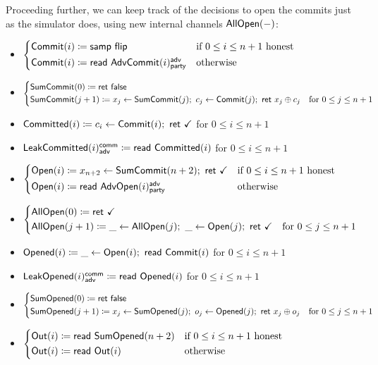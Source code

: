 \noindent Proceeding further, we can keep track of the decisions to open the commits just as the simulator does, using new internal channels $\mathsf{AllOpen}(-)$:

\begin{itemize}
\item {\color{blue} $\begin{cases*} \Commit(i) \coloneqq \samp{\flip} & \text{if $0 \leq i \leq n+1$ honest} \\ \Commit(i) \coloneqq \read{\AdvCommit(i)^\adv_\party} & \text{otherwise} \end{cases*}$}
\item {\color{blue} $\begin{cases*} \SumCommit(0) \coloneqq \ret{\false} & \\ \SumCommit(j+1) \coloneqq x_j \leftarrow \SumCommit(j); \ c_j \leftarrow \Commit(j); \ \ret{x_j \oplus c_j} & \text{for $0 \leq j \leq n+1$} \end{cases*}$}
\item {\color{magenta} $\mathsf{Committed}(i) \coloneqq c_i \leftarrow \mathsf{Commit}(i); \ \mathsf{ret} \ \checkmark$ for $0 \leq i \leq n+1$}
\item {\color{magenta} $\mathsf{LeakCommitted}(i)^{\mathsf{comm}}_{\mathsf{adv}} \coloneqq \mathsf{read} \ \mathsf{Committed}(i)$ for $0 \leq i \leq n+1$}
\item {\color{teal} $\begin{cases*} \Open(i) \coloneqq x_{n+2} \leftarrow \SumCommit(n+2); \ \ret{\checkmark} & \text{if $0 \leq i \leq n+1$ honest} \\ \Open(i) \coloneqq \read{\AdvOpen(i)^\adv_\party} & \text{otherwise} \end{cases*}$}
\item {\color{teal} $\begin{cases*} \AllOpen(0) \coloneqq \ret{\checkmark} & \\ \AllOpen(j+1) \coloneqq \_ \leftarrow \AllOpen(j); \ \_ \leftarrow \Open(j); \ \ret{\checkmark} & \text{for $0 \leq j \leq n+1$} \end{cases*}$}
\item {\color{red} $\mathsf{Opened}(i) \coloneqq \_ \leftarrow \mathsf{Open}(i); \ \mathsf{read} \ \mathsf{Commit}(i)$ for $0 \leq i \leq n+1$}
\item {\color{red} $\mathsf{LeakOpened}(i)^{\mathsf{comm}}_{\mathsf{adv}} \coloneqq \mathsf{read} \ \mathsf{Opened}(i)$ for $0 \leq i \leq n+1$}
\item {\color{red} $\begin{cases*} \SumOpened(0) \coloneqq \ret{\false} & \\ \SumOpened(j+1) \coloneqq x_j \leftarrow \SumOpened(j); \ o_j \leftarrow \Opened(j); \ \ret{x_j \oplus o_j} & \text{for $0 \leq j \leq n+1$} \end{cases*}$}
\item $\begin{cases*} \Out(i) \coloneqq \read{\SumOpened(n+2)} & \text{if $0 \leq i \leq n+1$ honest} \\ \Out(i) \coloneqq \read{\Out(i)} & \text{otherwise} \end{cases*}$
\end{itemize}

